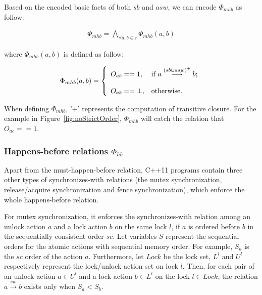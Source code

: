 \documentclass[preprint, numbers, 10pt]{sigplanconf}
\begin{document}
Based on the encoded basic facts of both $sb$ and $asw$, we can encode $\Phi_{mhb}$ as follow: 

\begin{equation}
\begin{aligned}
\Phi_{mhb} = \bigwedge_{\forall a,b\in \tau} \Phi_{mhb}(a,b)
\end{aligned}
\end{equation}

where $\Phi_{mhb}(a,b)$ is defined as follow: 

\[\Phi_{mhb}(a,b) = \left\{
  \begin{array}{l l}
    O_{ab}==1,           &  {\text{if $a \stackrel{(sb\cup asw)^+}{\longrightarrow} b$;}}\\\\
    O_{ab}==\bot,  &  \text{otherwise}.
  \end{array} \right.\]

When defining $\Phi_{mhb}$, '+' represents the computation of transitive closure. 
For the example in Figure~\ref{fig:noStrictOrder}, $\Phi_{mhb}$ will catch the relation
that $O_{ac}==1$. 

\subsubsection{Happens-before relations $\Phi_{hb}$}

Apart from the must-happen-before relation, C++11 programs 
contain three other types of synchronizes-with relations (the
mutex synchronization, release/acquire synchronization and fence synchronization),
which enforce the whole happens-before relation.  

For mutex synchronization, it enforces the synchronizes-with relation among an unlock action $a$
and a lock action $b$ on the same lock $l$, if $a$ is ordered before $b$ in the sequentially consistent 
order $sc$.  Let variables $S$ represent the sequential orders for the atomic actions with sequential
memory order. For example, $S_a$ is the $sc$ order of the action $a$. Furthermore, 
let $Lock$ be the lock set, $L^l$ and $U^l$ respectively represent the lock/unlock action set on lock $l$. 
Then, for each pair of an unlock action $a\in U^l$ and a lock action $b\in L^l$ on the lock $l\in Lock$, the 
relation $a \stackrel{sw}{\longrightarrow} b$ exists only when $S_a<S_b$.
\end{document}
